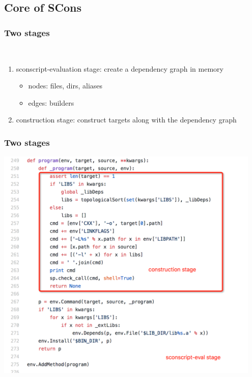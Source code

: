 \documentclass[lualatex]{beamer}
\begin{document}
\subsection{Core of SCons}

\begin{frame}
  \frametitle{Two stages}

  \begin{block}{~}
    \begin{enumerate}
    \item sconscript-evaluation stage: create a dependency graph in memory
      \begin{itemize}
      \item nodes: files, dirs, aliases
      \item edges: builders
      \end{itemize}
    \item construction stage: construct targets along with the dependency graph
    \end{enumerate}
  \end{block}
\end{frame}

\begin{frame}
  \frametitle{Two stages}

  \begin{center}
    \includegraphics[width=0.95\textwidth,height=0.85\textheight]{stages.png}
  \end{center}
\end{frame}
\end{document}
